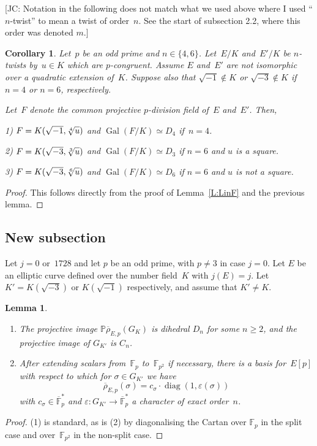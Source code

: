 \documentclass[12pt, reqno]{amsart}
\newcommand{\F}{\mathbb{F}}
\newcommand{\PP}{\mathbb{P}}
\newcommand{\rhobar}{{\overline{\rho}}}
\newcommand{\eps}{\varepsilon}
\DeclareMathOperator{\Gal}{Gal}
\newcommand{\diag}{{\operatorname{diag}}}
\numberwithin{equation}{section}
\newtheorem{lemma}[theorem]{Lemma}
\newtheorem{corollary}[theorem]{Corollary}
\theoremstyle{definition}
\theoremstyle{remark}
\newcommand{\jc}[1]{{\color{darkgreen} \textsf{[JC: #1]}}}
\begin{document}
\jc{Notation in the following does not match what we used above where
  I used ``$n$-twist'' to mean a twist of order~$n$.  See the start of
subsection 2.2, where this order was denoted $m$.}

\begin{corollary}
Let~$p$ be an odd prime and $n \in \{4,6 \}$. Let~$E/K$ and~$E'/K$ be $n$-twists by~$u \in K$ which are $p$-congruent. 
Assume $E$ and~$E'$
are not isomorphic over a quadratic extension of~$K$. Suppose also that $\sqrt{-1} \not\in K$ or
$\sqrt{-3} \not\in K$ if $n=4$ or $n=6$, respectively.

Let~$F$ denote the common projective $p$-division field of~$E$ and~$E'$. Then,

1) $F = K(\sqrt{-1}, \root 4 \of u)$ and $\Gal(F/K) \simeq D_4$ if~$n = 4$.

2) $F = K(\sqrt{-3}, \root 3 \of u)$
and $\Gal(F/K) \simeq D_3$ if $n=6$ and $u$ is a square.

3) $F = K(\sqrt{-3}, \root 6 \of u)$
and $\Gal(F/K) \simeq D_6$ if $n=6$ and $u$ is not a square.
\end{corollary}
\begin{proof} This follows directly from the proof of Lemma~\ref{L:LinF} and the previous lemma.
\end{proof}

\subsection{New subsection}

Let $j=0$ or~$1728$ and let $p$ be an odd prime, with $p\not=3$ in
case $j=0$.  Let $E$ be an elliptic curve defined over the number
field~$K$ with $j(E)=j$.  Let $K'=K(\sqrt{-3})$ or $K(\sqrt{-1})$
respectively, and assume that $K'\not=K$.

\begin{lemma}
\begin{enumerate}
  \item
The projective image $\PP\rhobar_{E,p}(G_K)$ is dihedral $D_n$ for
some $n\ge2$, and the projective image of $G_{K'}$ is $C_n$.
\item
After extending scalars from~$\F_p$ to~$\F_{p^2}$ if necessary, there
is a basis for~$E[p]$ with respect to which for $\sigma\in G_{K'}$ we
have
\[
\rhobar_{E,p}(\sigma) = c_\sigma\cdot\diag(1,\eps(\sigma))
\]
with $c_\sigma\in\overline{\F}_p^*$ and
$\eps:G_{K'}\to\overline{\F}_p^*$ a character of exact order~$n$.
\end{enumerate}
\end{lemma}
\begin{proof}
(1) is standard, as is (2) by diagonalising the Cartan over $\F_p$ in
  the split case and over~$\F_{p^2}$ in the non-split case.
\end{proof}
\end{document}
